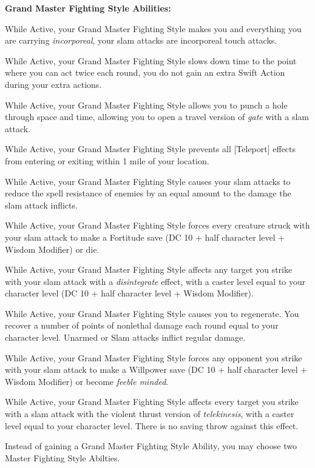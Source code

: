 \textbf{Grand Master Fighting Style Abilities:}
\begin{itemize*}
\item While Active, your Grand Master Fighting Style makes you and everything 
you are carrying \textit{incorporeal}, your slam attacks are incorporeal touch 
attacks.
\item While Active, your Grand Master Fighting Style slows down time to the point where you can act twice each round, you do not gain an extra Swift Action during your extra actions.
\item While Active, your Grand Master Fighting Style allows you to punch a hole through space and time, allowing you to open a travel version of \textit{gate} with a slam attack.
\item While Active, your Grand Master Fighting Style prevents all [Teleport] effects from entering or exiting within 1 mile of your location.
\item While Active, your Grand Master Fighting Style causes your slam attacks to reduce the spell resistance of enemies by an equal amount to the damage the slam attack inflicts.
\item While Active, your Grand Master Fighting Style forces every creature struck with your slam attack to make a Fortitude save (DC 10 + half character level + Wisdom Modifier) or die.
\item While Active, your Grand Master Fighting Style affects any target you strike with your slam attack with a \textit{disintegrate} effect, with a caster level equal to your character level (DC 10 + half character level + Wisdom Modifier).
\item While Active, your Grand Master Fighting Style causes you to regenerate. You recover a number of points of nonlethal damage each round equal to your character level. Unarmed or Slam attacks inflict regular damage.
\item While Active, your Grand Master Fighting Style forces any opponent you strike with your slam attack to make a Willpower save (DC 10 + half character level + Wisdom Modifier) or become \textit{feeble minded}.
\item While Active, your Grand Master Fighting Style affects every target you strike with a slam attack with the violent thrust version of \textit{telekinesis}, with a caster level equal to your character level. There is no saving throw against this effect.
\item Instead of gaining a Grand Master Fighting Style Ability, you may choose two Master Fighting Style Abilties.
\end{itemize*}


